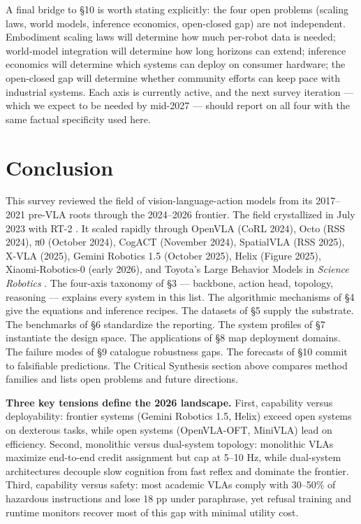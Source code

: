 \documentclass{article}
\begin{document}
A final bridge to §10 is worth stating explicitly: the four open problems (scaling laws, world models, inference economics, open-closed gap) are not independent. Embodiment scaling laws will determine how much per-robot data is needed; world-model integration will determine how long horizons can extend; inference economics will determine which systems can deploy on consumer hardware; the open-closed gap will determine whether community efforts can keep pace with industrial systems. Each axis is currently active, and the next survey iteration --- which we expect to be needed by mid-2027 --- should report on all four with the same factual specificity used here.

\section{Conclusion}\label{conclusion}

This survey reviewed the field of vision-language-action models from its 2017--2021 pre-VLA roots through the 2024--2026 frontier. The field crystallized in July 2023 with RT-2 \cite{brohan2023rt2visionlanguagea}. It scaled rapidly through OpenVLA (CoRL 2024), Octo (RSS 2024), π0 (October 2024), CogACT (November 2024), SpatialVLA (RSS 2025), X-VLA (2025), Gemini Robotics 1.5 (October 2025), Helix (Figure 2025), Xiaomi-Robotics-0 (early 2026), and Toyota's Large Behavior Models in \emph{Science Robotics} \cite{barreiros2026acarefulexaminatio}. The four-axis taxonomy of §3 --- backbone, action head, topology, reasoning --- explains every system in this list. The algorithmic mechanisms of §4 give the equations and inference recipes. The datasets of §5 supply the substrate. The benchmarks of §6 standardize the reporting. The system profiles of §7 instantiate the design space. The applications of §8 map deployment domains. The failure modes of §9 catalogue robustness gaps. The forecasts of §10 commit to falsifiable predictions. The Critical Synthesis section above compares method families and lists open problems and future directions.

\textbf{Three key tensions define the 2026 landscape.} First, capability versus deployability: frontier systems (Gemini Robotics 1.5, Helix) exceed open systems on dexterous tasks, while open systems (OpenVLA-OFT, MiniVLA) lead on efficiency. Second, monolithic versus dual-system topology: monolithic VLAs maximize end-to-end credit assignment but cap at 5--10 Hz, while dual-system architectures decouple slow cognition from fast reflex and dominate the frontier. Third, capability versus safety: most academic VLAs comply with 30--50\% of hazardous instructions and lose 18 pp under paraphrase, yet refusal training and runtime monitors recover most of this gap with minimal utility cost.
\end{document}
